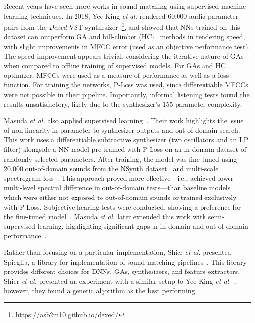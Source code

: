 Recent years have seen more works in sound-matching using supervised machine learning techniques. In 2018, Yee-King \textit{et al.} rendered 60,000 audio-parameter pairs from the \textit{Dexed} \gls{VST} synthesizer~\footnote{https://asb2m10.github.io/dexed/}, and showed that NNs trained on this dataset can outperform GA and hill-climber (\gls{HC})~\cite{hoffmann2000heuristic} methods in rendering speed, with slight improvements in MFCC error (used as an objective performance test). The speed improvement appears trivial, considering the iterative nature of GAs when compared to offline training of supervised models. For GAs and HC optimizer, MFCCs were used as a measure of performance as well as a loss function. For training the networks, P-Loss was used, since differentiable MFCCs were not possible in their pipeline. Importantly, informal listening tests found the results unsatisfactory, likely due to the synthesizer’s 155-parameter complexity. 

Masuda \textit{et al.} also applied supervised learning~\cite{masuda2021soundmatch}. Their work highlights the issue of non-linearity in parameter-to-synthesizer outputs and out-of-domain search. This work uses a differentiable subtractive synthesizer (two oscillators and an LP filter) alongside a NN model pre-trained with P-Loss on an in-domain dataset of randomly selected parameters. After training, the model was fine-tuned using 20,000 out-of-domain sounds from the NSynth dataset~\cite{engel2017neural} and multi-scale spectrogram loss~\cite{engel2020ddsp}. This approach proved more effective---i.e., achieved lower multi-level spectral difference in out-of-domain tests---than baseline models, which were either not exposed to out-of-domain sounds or trained exclusively with P-Loss. Subjective hearing tests were conducted, showing a preference for the fine-tuned model~\cite{masuda2021soundmatch}. Masuda \textit{et al.} later extended this work with semi-supervised learning, highlighting significant gaps in in-domain and out-of-domain performance~\cite{masuda2023improving}.

Rather than focusing on a particular implementation, Shier \textit{et al.} presented Spieglib, a library for implementation of sound-matching pipelines~\cite{shier2020spiegelib}. This library provides different choices for DNNs, GAs, synthesizers, and feature extractors. Shier \textit{et al.} presented an experiment with a similar setup to Yee-King \textit{et al.}~\cite{yee2018automatic}, however, they found a genetic algorithm as the best performing.

